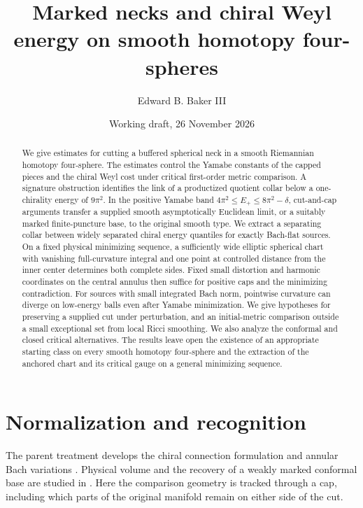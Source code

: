 \documentclass[11pt]{article}
\title{Marked necks and chiral Weyl energy on smooth homotopy four-spheres}
\author{Edward B. Baker III}
\date{Working draft, 26 November 2026}
\numberwithin{equation}{section}
\theoremstyle{definition}
\theoremstyle{remark}
\begin{document}
\maketitle
\begin{abstract}
We give estimates for cutting a buffered spherical neck in a smooth
Riemannian homotopy four-sphere. The estimates control the Yamabe
constants of the capped pieces and the chiral Weyl cost under
critical first-order metric comparison. A signature obstruction
identifies the link of a productized quotient collar below a
one-chirality energy of \(9\pi^2\). In the positive Yamabe band
\(4\pi^2\le E_+\le8\pi^2-\delta\), cut-and-cap arguments transfer
a supplied smooth asymptotically Euclidean limit, or a suitably
marked finite-puncture base, to the original smooth type. We extract
a separating collar between widely separated chiral energy quantiles
for exactly Bach-flat sources. On a fixed physical minimizing
sequence, a sufficiently wide elliptic spherical chart with
vanishing full-curvature integral and one point at controlled
distance from the inner center determines both complete sides.
Fixed small distortion and harmonic coordinates on the central
annulus then suffice for positive caps and the minimizing
contradiction. For sources with small integrated
Bach norm, pointwise curvature can diverge on low-energy balls even
after Yamabe minimization. We give hypotheses for preserving a
supplied cut under perturbation, and an initial-metric comparison
outside a small exceptional set from local Ricci smoothing. We
also analyze the conformal and closed critical alternatives. The
results leave open the existence of an appropriate starting class
on every smooth homotopy four-sphere and the extraction of the
anchored chart and its critical gauge on a general minimizing
sequence.
\end{abstract}

\tableofcontents

\section{Normalization and recognition}

The parent treatment develops the chiral connection
formulation and annular Bach variations
\cite[Sections 11--15]{Baker2026TwistorSections}.
Physical volume and the recovery of a weakly marked conformal
base are studied in \cite{Baker2026MarkedLimits}. Here the
comparison geometry is tracked through a cap, including which
parts of the original manifold remain on either side of the cut.
\end{document}
